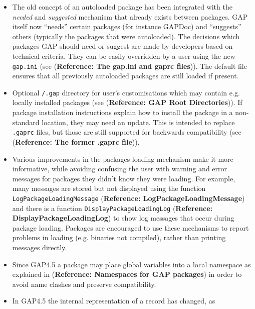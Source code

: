\documentclass[a4paper,11pt]{report}
\begin{document}
{{{\begin{itemize}
 Some packages still use the old ``gapmacro'' format for their manuals, for which support may be discontinued in the future.
There is no urgent need to convert such manuals into the \textsf{GAPDoc} format before \textsf{GAP}{\nobreakspace}4.5 release, but we encourage you very much to consider doing
this at some later point. 
\item  The old concept of an autoloaded package has been integrated with the \emph{needed} and \emph{suggested} mechanism that already exists between packages. \textsf{GAP} itself now ``needs'' certain packages (for instance \textsf{GAPDoc}) and ``suggests'' others (typically the packages that were autoloaded). The decisions which
packages \textsf{GAP} should need or suggest are made by developers based on technical criteria.
They can be easily overridden by a user using the new \texttt{gap.ini} (see  (\textbf{Reference: The gap.ini and gaprc files})). The default file ensures that all previously autoloaded packages are still
loaded if present. 
\item  Optional \texttt{\texttt{}/.gap} directory for user's customisations which may contain e.g. locally installed
packages (see  (\textbf{Reference: GAP Root Directories})). If package installation instructions explain how to install the package in
a non-standard location, they may need an update. This is intended to replace \texttt{.gaprc} files, but those are still supported for backwards compatibility (see  (\textbf{Reference: The former .gaprc file})). 
\item  Various improvements in the packages loading mechanism make it more
informative, while avoiding confusing the user with warning and error messages
for packages they didn't know they were loading. For example, many messages
are stored but not displayed using the function \texttt{LogPackageLoadingMessage} (\textbf{Reference: LogPackageLoadingMessage}) and there is a function \texttt{DisplayPackageLoadingLog} (\textbf{Reference: DisplayPackageLoadingLog}) to show log messages that occur during package loading. Packages are
encouraged to use these mechanisms to report problems in loading (e.g.
binaries not compiled), rather than printing messages directly. 
\item  Since \textsf{GAP}{\nobreakspace}4.5 a package may place global variables into a local namespace
as explained in  (\textbf{Reference: Namespaces for GAP packages}) in order to avoid name clashes and preserve compatibility. 
\item  In \textsf{GAP}{\nobreakspace}4.5 the internal representation of a record has changed, as

\end{itemize}}}}
\end{document}

